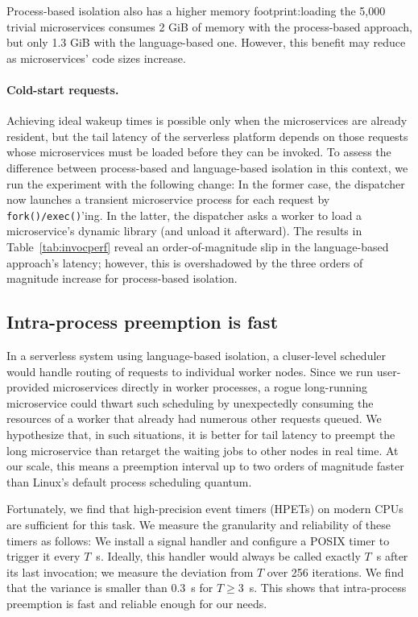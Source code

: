 Process-based isolation also has a higher memory footprint:\@ loading the 5,000
trivial microservices consumes 2 GiB of memory with the process-based approach, but
only 1.3 GiB with the language-based one.  However, this benefit may reduce as
microservices' code sizes increase.

\paragraph{Cold-start requests.}
Achieving ideal wakeup times is possible only when the microservices are
already resident, but the tail latency of the serverless platform depends on
those requests whose microservices must be loaded
before they can be invoked.  To assess the difference between process-based and
language-based isolation in this context, we run the experiment with the following
change:  In the former case, the dispatcher now launches a transient
microservice process for each request by \texttt{fork()/exec()}'ing.  In the latter,
the dispatcher asks a worker to load a microservice's dynamic library (and
unload it afterward).  The results in Table~\ref{tab:invocperf} reveal an
order-of-magnitude slip in the language-based approach's latency; however, this is
overshadowed by the three orders of magnitude increase for process-based
isolation.

\subsection{Intra-process preemption is fast}
In a serverless system using language-based isolation, a cluser-level scheduler would
handle routing of requests to individual worker nodes.  Since we run user-provided
microservices directly in worker processes, a rogue long-running microservice could
thwart such scheduling by unexpectedly consuming the resources of a worker that
already had numerous other requests queued.  We hypothesize that, in such situations,
it is better for tail latency to preempt the long microservice than retarget the
waiting jobs to other nodes in real time.  At our scale, this means a preemption
interval up to two orders of magnitude faster than Linux's default  process
scheduling quantum.

Fortunately, we find that high-precision event timers (HPETs) on modern CPUs
are sufficient for this task. We measure the granularity and reliability of
these timers as follows: We install a signal handler and configure a POSIX timer to
trigger it every $T$~\textmu{}s.
Ideally, this handler would always be called exactly $T$~\textmu{}s after its last
invocation; we measure the deviation from $T$ over 256 iterations.
We find that the variance
is smaller than 0.3~\textmu{}s for $T \ge 3$~\textmu{}s. This shows that
intra-process preemption is fast and reliable enough for our needs.

